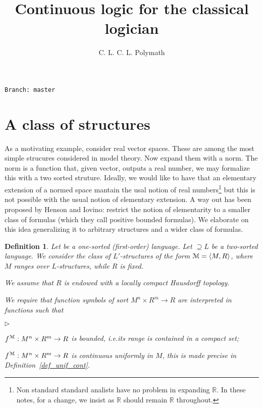 \documentclass[12pt,letterpaper,oneside,reqno]{amsart}
\author{C. L. C. L. Polymath}
\newcommand{\mylabel}[1]{{#1}\hfill}
\renewenvironment{itemize}
  {\begin{list}{$\triangleright$}{%
   \setlength{\parskip}{0mm}
   \setlength{\topsep}{.2\baselineskip}
   \setlength{\rightmargin}{0mm}
   \setlength{\listparindent}{0mm}
   \setlength{\itemindent}{0mm}
   \setlength{\labelwidth}{3ex}
   \setlength{\itemsep}{.2\baselineskip}
   \setlength{\parsep}{.2\baselineskip}
   \setlength{\partopsep}{0mm}
   \setlength{\labelsep}{1ex}
   \setlength{\leftmargin}{\labelwidth+\labelsep}
   \let\makelabel\mylabel}}{%
   \end{list}}
\theoremstyle{plain}
\newtheorem{definition}[theorem]{Definition}
\theoremstyle{remark}
\renewcommand*{\emph}[1]{%
   \smash{\tikz[baseline]\node[rectangle, fill=olive!25, rounded corners, inner xsep=0.5ex, inner ysep=0.2ex, anchor=base, minimum height = 2.7ex]{#1};}}
\begin{document}
\title{Continuous logic for the classical logician}
\hfill\texttt{Branch:\ master\ \DTMnow}\bigskip
\maketitle
\raggedbottom




\section{A class of structures}\label{uno}


\def\ceq#1#2#3{\parbox[t]{23ex}{$\displaystyle #1$}\parbox{6ex}{\hfil $#2$}{$\displaystyle #3$}}

As a motivating example, consider real vector spaces.
These are among the most simple strucures considered in model theory.
Now expand them with a norm.
The norm is a function that, given vector, outputs a real number, we may formalize this with a two sorted struture.
Ideally, we would like to have that an elementary extension of a normed space mantain the usal notion of real numbers\footnote{Non standard standard analists have no problem in expanding $\mathds{R}$. In these notes, for a change, we insist as $\mathds{R}$ should remain $\mathds{R}$ throughout.} but this is not possible with the usual notion of elementary extension.
A way out has been proposed by Henson and Iovino: restrict the notion of elementarity to a smaller class of formulas (which they call positive bounded formulas).
We elaborate on this idea generalizing it to arbitrary structures and a wider class of formulas.

\begin{definition}\label{def_0}
  Let \emph{$L$\/} be a one-sorted (first-order) language.
  Let \emph{$L'$\/}$\supseteq L$ be a two-sorted language.
  We consider the class of $L'$-structures of the form ${\EuScript M}=\langle  M,R\rangle$, where $M$ ranges over $L$-structures, while $R$ is fixed.

  We assume that $R$ is endowed with a locally compact Hausdorff topology.

  We require that function symbols of sort $M^n\times R^m\to R$ are interpreted in functions such that
  \begin{itemize}
    \item[i.] $f^{\EuScript M}:M^n\times R^m\to R$ is bounded, i.e.\@ its range is contained in a compact set;
    \item[ii.] $f^{\EuScript M}:M^n\times R^m\to R$ is continuous uniformly in $M$, this is made precise in Definition~\ref{def_unif_cont}.
  \end{itemize}
\end{definition}
\end{document}
